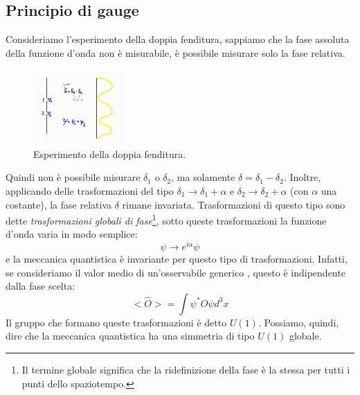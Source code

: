 \subsection{Principio di gauge}

Consideriamo l'esperimento della doppia fenditura, sappiamo che la fase assoluta della funzione d'onda non è misurabile, è possibile misurare solo la fase relativa.
\begin{figure}[H]
    \centering
    \includegraphics[width=0.31\textwidth]{Immagini/Doppia_fenditura.jpg}
    \caption{Esperimento della doppia fenditura.}
    \label{fig:fenditura}
\end{figure}
Quindi non è possibile misurare $\delta_1$ o $\delta_2$, ma solamente $\delta=\delta_1-\delta_2$. Inoltre, applicando delle trasformazioni del tipo $\delta_1\xrightarrow{}\delta_1+\alpha$ e $\delta_2\xrightarrow{}\delta_2+\alpha$ (con $\alpha$ una costante), la fase relativa $\delta$ rimane invariata. Trasformazioni di questo tipo sono dette \textit{trasformazioni globali di fase}\footnote{Il termine globale significa che la ridefinizione della fase è la stessa per tutti i punti dello spaziotempo.}, sotto queste trasformazioni la funzione d'onda varia in modo semplice:
\begin{equation}
    \psi\xrightarrow{}e^{i\alpha}\psi
\end{equation}
e la meccanica quantistica è invariante per questo tipo di trasformazioni. Infatti, se consideriamo il valor medio di un'osservabile generico , questo è indipendente dalla fase scelta:
\begin{equation}
    <\hat{O}>=\int\psi^*\hat{O}\psi d^3x
\end{equation}
Il gruppo che formano queste trasformazioni è detto $U(1)$. Possiamo, quindi, dire che la meccanica quantistica ha una simmetria di tipo $U(1)$ globale.

